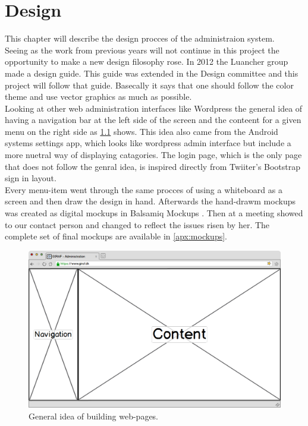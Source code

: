 \chapter{Design}
\label{chp:design}
This chapter will describe the design procces of the administraion system.\\
Seeing as the work from previous years will not continue in this project the opportunity to make a new design filosophy rose. 
In 2012 the Luancher group made a design guide. This guide was extended in the Design committee and this project will follow that guide. Basecally it says that one should follow the color theme  and use vector graphics as much as possible. \\
Looking at other web administration interfaces like Wordpress the general idea of having a navigation bar at the left side of the screen and the conteent for a given menu on the right side as \ref{fig:ideaWep} shows. This idea also came from the Android systems settings app, which looks like wordpress admin interface but include a more nuetral way of displaying catagories. The login page, which is the only page that does not follow the genral idea, is inspired directly from Twiiter's  Bootstrap sign in layout.\\ 
Every menu-item went through the same procces of using a whiteboard as a screen and then draw the design in hand. Afterwards the hand-drawm mockups was  created as digital mockups in Balsamiq Mockups . Then at a meeting showed to our contact person and changed to reflect the issues risen by her. The complete set of final mockups are available in \ref{apx:mockups}.\\

\begin{figure}[!h]
\centering
\includegraphics[width=1\textwidth]{images/mockup/displayMode.png}
\caption{General idea of building web-pages.}
\label{fig:ideaWep}
\end{figure}


